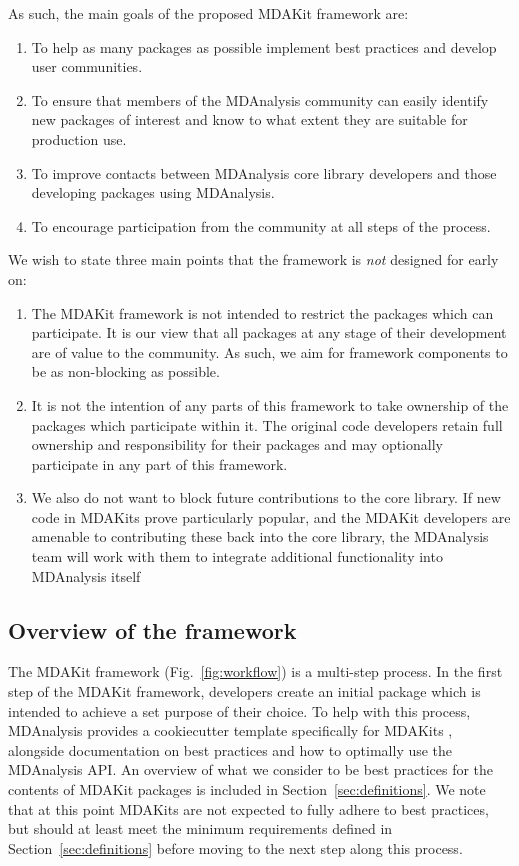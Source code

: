 \documentclass[9pt,whitepaper]{livecoms}
\begin{document}
As such, the main goals of the proposed MDAKit framework are:
\begin{enumerate}
    \item To help as many packages as possible implement best practices and develop user communities.
    \item To ensure that members of the MDAnalysis community can easily identify new packages of interest and know to what extent they are suitable for production use.
    \item To improve contacts between MDAnalysis core library developers and those developing packages using MDAnalysis.
    \item To encourage participation from the community at all steps of the process.
\end{enumerate}
We wish to state three main points that the framework is \emph{not} designed for early on:
\begin{enumerate}
    \item The MDAKit framework is not intended to restrict the packages which can participate. It is our view that all packages at any stage of their development are of value to the community. As such, we aim for framework components to be as non-blocking as possible.
    \item It is not the intention of any parts of this framework to take ownership of the packages which participate within it. The original code developers retain full ownership and responsibility for their packages and may optionally participate in any part of this framework.
    \item We also do not want to block future contributions to the core library. If new code in MDAKits prove particularly popular, and the MDAKit developers are amenable to contributing these back into the core library, the MDAnalysis team will work with them to integrate additional functionality into MDAnalysis itself
\end{enumerate}

\subsection{Overview of the framework}
\label{sec:overviewframework}

The MDAKit framework (Fig.~\ref{fig:workflow}) is a multi-step process. In the first step of the MDAKit framework, developers create an initial package which is intended to achieve a set purpose of their choice. To help with this process, MDAnalysis provides a cookiecutter template specifically for MDAKits \cite{wang_cookiecutter_nodate}, alongside documentation on best practices and how to optimally use the MDAnalysis API. An overview of what we consider to be best practices for the contents of MDAKit packages is included in Section~\ref{sec:definitions}. We note that at this point MDAKits are not expected to fully adhere to best practices, but should at least meet the minimum requirements defined in Section~\ref{sec:definitions} before moving to the next step along this process.
\end{document}
